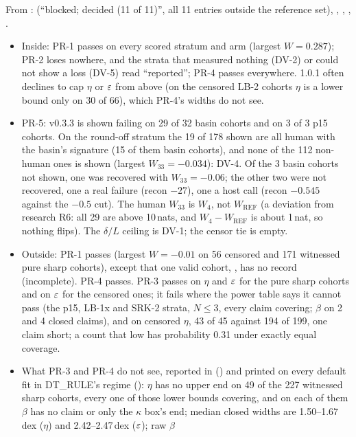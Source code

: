 \tplEvidence
From :  (``blocked; decided (11 of 11)'', all 11 entries
outside the reference set),
, , , .
\begin{itemize}[nosep]
  \item Inside: PR-1 passes on every scored stratum and arm (largest $W=0.287$); PR-2 loses nowhere, and the strata
    that measured nothing (DV-2) or could not show a loss (DV-5) read ``reported''; PR-4 passes everywhere. 1.0.1 often declines to cap $\eta$ or $\varepsilon$ from above (on the
    censored LB-2 cohorts $\eta$ is a lower bound only on 30 of 66), which PR-4's widths do not see.
  \item PR-5: v0.3.3 is shown failing on 29 of 32 basin cohorts and on 3 of 3 p15 cohorts. On the round-off stratum
    the 19 of 178 shown are all human with the basin's signature (15 of them basin cohorts), and none of the 112
    non-human ones is shown (largest $W_{33}=-0.034$): DV-4. Of the 3 basin cohorts not shown, one was recovered with
    $W_{33}=-0.06$; the other two were not recovered, one a real failure (recon $-27$), one a host call (recon $-0.545$
    against the $-0.5$ cut). The human $W_{33}$ is $W_4$, not $W_{\mathrm{REF}}$ (a deviation from research R6: all 29
    are above 10\,nats, and $W_4-W_{\mathrm{REF}}$ is about 1\,nat, so nothing flips). The $\delta/L$ ceiling is DV-1;
    the censor tie is empty.
  \item Outside: PR-1 passes (largest $W=-0.01$ on 56 censored and 171 witnessed pure sharp cohorts), except that one
    valid cohort, , has no record (incomplete). PR-4 passes. PR-3 passes on $\eta$ and $\varepsilon$ for
    the pure sharp cohorts and on $\varepsilon$ for the censored ones; it fails where the power table says it cannot pass
    (the p15, LB-1x and SRK-2 strata, $N\le3$, every claim covering; $\beta$ on 2 and 4 closed claims), and on
    censored $\eta$, 43 of 45 against 194 of 199, one claim short; a count that low has probability 0.31 under
    exactly equal coverage.
  \item What PR-3 and PR-4 do not see, reported in  () and printed on every
    default fit in DT\_RULE's regime (): $\eta$ has no upper end on 49 of the 227
    witnessed sharp cohorts, every one of those lower bounds covering, and on each of them $\beta$ has no claim or only
    the $\kappa$ box's end; median closed widths are 1.50--1.67\,dex ($\eta$) and 2.42--2.47\,dex ($\varepsilon$); raw $\beta$

\end{itemize}
